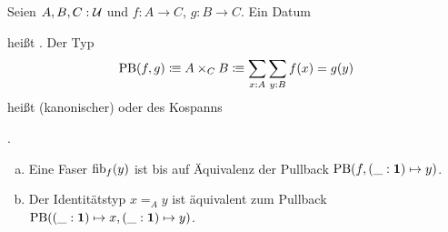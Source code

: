 \begin{definition}
Seien \(A,B,C:\mathcal{U}\) und \(f:A\to C\), \(g:B\to C\).
Ein Datum 
heißt . Der Typ
\[
  \mathrm{PB}(f,g)\vcentcolon\mspace{-1.2mu}\equiv A\times_C B\vcentcolon\mspace{-1.2mu}\equiv \sum_{x:A}\sum_{y:B}f(x)=g(y)
\]
heißt (kanonischer)  oder  des Kospanns 
.
\end{definition}

\begin{beispiel}
\begin{enumerate}[(a)]
\item Eine Faser \(\mathrm{fib}_f(y)\) ist bis auf Äquivalenz der Pullback \(\mathrm{PB}(f,(\_:\mathbf{1})\mapsto y)\).
\item Der Identitätstyp \(x=_A y\) ist äquivalent zum Pullback \(\mathrm{PB}((\_:\mathbf{1})\mapsto x, (\_:\mathbf{1})\mapsto y)\).
\end{enumerate}
\end{beispiel}



